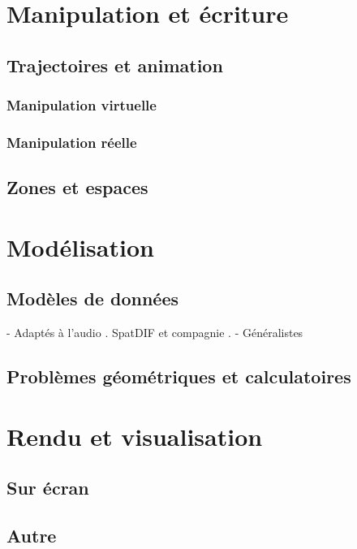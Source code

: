 \documentclass[french,12pt]{article}
\begin{document}
\section{Manipulation et écriture}
\subsection{Trajectoires et animation}
\cite{garcia_jeremie_processing_2015,garcia_towards_2015}
\cite{wakefield_cosm:_2011}
\cite{wagner_introducing_2014}
\cite{melchior_authoring_2005} 
\cite{bresson_spatial_2012}
\cite{wozniewski_spatosc:_2012}
\cite{favory_trajectoires:_2015}
\subsubsection{Manipulation virtuelle}
\subsubsection{Manipulation réelle}

\subsection{Zones et espaces}

\section{Modélisation}
\subsection{Modèles de données}
- Adaptés à l'audio
. SpatDIF et compagnie \cite{peters_spatial_2013}\cite{kendall_towards_2008}
. \cite{kondoz_object-based_2014}
- Généralistes

\subsection{Problèmes géométriques et calculatoires}

\section{Rendu et visualisation}
\subsection{Sur écran}
\subsection{Autre}
\printbibliography
\end{document}
